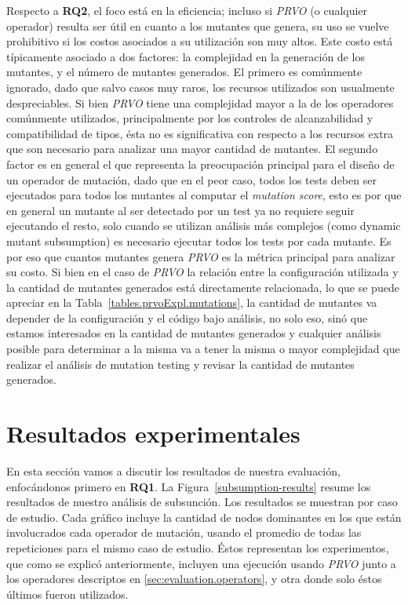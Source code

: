 Respecto a \textbf{RQ2}, el foco est\'a en la eficiencia; incluso si \emph{PRVO} (o cualquier operador) resulta ser \'util en cuanto a los mutantes que genera, su uso se vuelve prohibitivo si los costos asociados a su utilizaci\'on son muy altos. Este costo est\'a t\'ipicamente asociado a dos factores: la complejidad en la generaci\'on de los mutantes, y el n\'umero de mutantes generados. El primero es com\'unmente ignorado, dado que salvo casos muy raros, los recursos utilizados son usualmente despreciables. Si bien \emph{PRVO} tiene una complejidad mayor a la de los operadores com\'unmente utilizados, principalmente por los controles de alcanzabilidad y compatibilidad de tipos, \'esta no es significativa con respecto a los recursos extra que son necesario para analizar una mayor cantidad de mutantes. El segundo factor es en general el que representa la preocupaci\'on principal para el dise\~no de un operador de mutaci\'on, dado que en el peor caso, todos los tests deben ser ejecutados para todos los mutantes al computar el \emph{mutation score}, esto es por que en general un mutante al ser detectado por un test ya no requiere seguir ejecutando el resto, solo cuando se utilizan an\'alisis m\'as complejos (como dynamic mutant subsumption) es necesario ejecutar todos los tests por cada mutante. Es por eso que cuantos mutantes genera \emph{PRVO} es la m\'etrica principal para analizar su costo. Si bien en el caso de \emph{PRVO} la relaci\'on entre la configuraci\'on utilizada y la cantidad de mutantes generados est\'a directamente relacionada, lo que se puede apreciar en la Tabla~\ref{tables.prvoExpl.mutations}, la cantidad de mutantes va depender de la configuraci\'on y el c\'odigo bajo an\'alisis, no solo eso, sin\'o que estamos interesados en la cantidad de mutantes generados y cualquier an\'alisis posible para determinar a la misma va a tener la misma o mayor complejidad que realizar el an\'alisis de mutation testing y revisar la cantidad de mutantes generados.

\section{Resultados experimentales}
\label{sec:evaluation.results}

En esta secci\'on vamos a discutir los resultados de nuestra evaluaci\'on, enfoc\'andonos primero en \textbf{RQ1}. La Figura~\ref{subsumption-results} resume los resultados de nuestro an\'alisis de subsunci\'on. Los resultados se muestran por caso de estudio. Cada gr\'afico incluye la cantidad de nodos dominantes en los que est\'an involucrados cada operador de mutaci\'on, usando el promedio de todas las repeticiones para el mismo caso de estudio. \'Estos representan los experimentos, que como se explic\'o anteriormente, incluyen una ejecuci\'on usando \emph{PRVO} junto a los operadores descriptos en \ref{sec:evaluation.operators}, y otra donde solo \'estos \'ultimos fueron utilizados.


